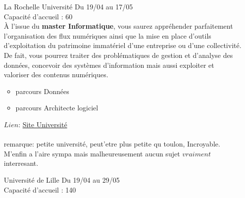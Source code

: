 \documentclass[a4paper,11pt]{article}
\newcommand{\e}{\'{e}}
\begin{document}
\begin{enumerate}
                \\Le \textbf{Master Informatique }correspond à une formation de très haut niveau associant compétences théoriques et pratiques, bases scientifiques et stages en entreprise il se décline en trois parcours-types:
            \begin{itemize}
                \item Ingénierie du Logiciel de la SociétE Numérique (ILSEN)
                \item Systèmes Informatiques Communicants : réseaux, services et sécurité
                \item Intelligence Artificielle (IA)
            \end{itemize}
                $Lien$: \href{https://ceri.univ-avignon.fr/formations/master-informatique/}{Site Université}\\
                remarque: Rien de tres remarquable mais il semblerait qu'elle possede un taux de pression faible, a v\e rifier
\\
        \item [\color{LightOrangeHaf} La Rochelle Université] Du 19/04 au 17/05 
                \\Capacité d'accueil : 60
                \\À l’issue du \textbf{master Informatique}, vous saurez appréhender parfaitement l’organisation des flux numériques ainsi que la mise en place d’outils d’exploitation du patrimoine immatériel d’une entreprise ou d’une collectivité. De fait, vous pourrez traiter des problématiques de gestion et d’analyse des données, concevoir des systèmes d’information mais aussi exploiter et valoriser des contenus numériques.
                \begin{itemize}
                    \item parcours Données
                    \item parcours Architecte logiciel
                \end{itemize}
                $Lien$: \href{https://sciences.univ-larochelle.fr/master-informatique}{Site Université}\\
                \\remarque: petite université, peut'etre plus petite qu toulon, Incroyable.  M'enfin a l'aire sympa mais malheureusement aucun sujet $vraiment$ interresant.
\\
        \item [\color{LightOrangeHaf}Université de Lille] Du 19/04 au 29/05
                \\Capacité d'accueil : 140

\end{enumerate}
\end{document}
